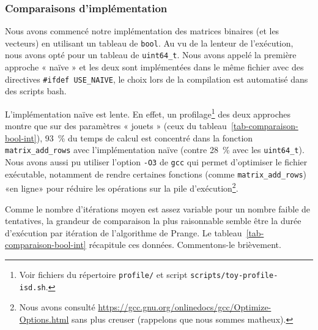 \documentclass[11pt,a4paper]{article}
\begin{document}
\subsubsection{Comparaisons d'implémentation}
\label{sec-isd-comparaison-bool-int64}

Nous avons commencé notre implémentation des matrices binaires (et les vecteurs)
en utilisant un tableau de \texttt{bool}.
Au vu de la lenteur de l'exécution, nous avons opté pour un tableau de
\texttt{uint64\_t}.
Nous avons appelé la première approche « naïve » et les deux sont implémentées
dans le même fichier avec des directives \texttt{\#ifdef USE\_NAIVE}, le choix
lors de la compilation est automatisé dans des scripts bash.

L'implémentation naïve est lente.
En effet, un profilage\footnote{Voir fichiers du répertoire \texttt{profile/} et
script \texttt{scripts/toy-profile-isd.sh}.} des deux approches montre que sur
des paramètres « jouets » (ceux du tableau~\ref{tab-comparaison-bool-int}),
\qty{93}{\percent} du temps de calcul est concentré dans la fonction
\texttt{matrix\_add\_rows} avec l'implémentation naïve (contre
\qty{28}{\percent} avec les \texttt{uint64\_t}).
Nous avons aussi pu utiliser l'option \texttt{-O3} de \texttt{gcc} qui permet
d'optimiser le fichier exécutable, notamment de rendre certaines fonctions
(comme \texttt{matrix\_add\_rows}) «en ligne» pour réduire les opérations sur la
pile d'exécution\footnote{Nous avons consulté
\url{https://gcc.gnu.org/onlinedocs/gcc/Optimize-Options.html} sans plus creuser
(rappelons que nous sommes matheux).}.

Comme le nombre d'itérations moyen est assez variable pour un nombre faible de
tentatives, la grandeur de comparaison la plus raisonnable semble être la durée
d'exécution par itération de l'algorithme de Prange.
Le tableau~\ref{tab-comparaison-bool-int} récapitule ces données.
Commentons-le brièvement.
\end{document}
